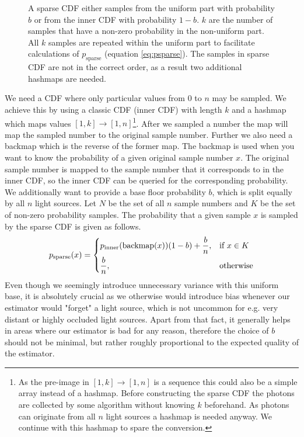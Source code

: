 \begin{figure}[htb]
\begin{tikzpicture}[scale=7, cdf/.style ={thick}]
    \end{tikzpicture}
    \caption{A sparse CDF either samples from the uniform part with probability $b$ or from the inner CDF with probability $1-b$. $k$ are the number of samples that have a non-zero probability in the non-uniform part. All $k$ samples are repeated within the uniform part to facilitate calculations of $p_{\text{sparse}}$ (equation \ref{eq:psparse}). The samples in sparse CDF are not in the correct order, as a result two additional hashmaps are needed.} 
    \label{fig:sparseCDF}
\end{figure}

We need a CDF where only particular values from $0$ to $n$ may be sampled. We achieve this by using a classic CDF (inner CDF) with length $k$ and a hashmap which maps values $[1,k]\to [1,n]$\footnote{As the pre-image in $[1,k]\to [1,n]$ is a sequence this could also be a simple array instead of a hashmap. Before constructing the sparse CDF the photons are collected by some algorithm without knowing $k$ beforehand. As photons can originate from all $n$ light sources a hashmap is needed anyway. We continue with this hashmap to spare the conversion.}. After we sampled a number the map will map the sampled number to the original sample number. Further we also need a backmap which is the reverse of the former map. The backmap is used when you want to know the probability of a given original sample number $x$. The original sample number is mapped to the sample number that it corresponds to in the inner CDF, so the inner CDF can be queried for the corresponding probability. We additionally want to provide a base floor probability $b$, which is split equally by all $n$ light sources. Let $N$ be the set of all $n$ sample numbers and $K$ be the set of non-zero probability samples. The probability that a given sample $x$ is sampled by the sparse CDF is given as follows.
\begin{equation}\label{eq:psparse}
 p_{\text{sparse}}(x) = 
\begin{dcases}
    p_{\text{inner}}(\text{backmap}(x))(1 - b) + \frac{b}{n},& \text{if } x \in K\\
    \frac{b}{n}, & \text{otherwise}
\end{dcases}
\end{equation}
Even though we seemingly introduce unnecessary variance with this uniform base, it is absolutely crucial as we otherwise would introduce bias whenever our estimator would "forget" a light source, which is not uncommon for e.g. very distant or highly occluded light sources. Apart from that fact, it generally helps in areas where our estimator is bad for any reason, therefore the choice of $b$ should not be minimal, but rather roughly proportional to the expected quality of the estimator.

